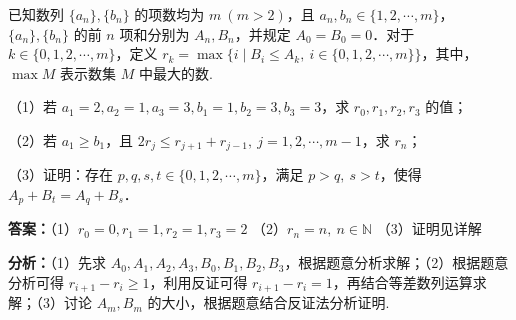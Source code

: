 \begin{question}[points=15]
已知数列 $\{a_n\}, \{b_n\}$ 的项数均为 $m\ (m>2)$，且 $a_n, b_n \in \{1,2,\cdots,m\}$，$\{a_n\}, \{b_n\}$ 的前 $n$ 项和分别为 $A_n, B_n$，并规定 $A_0=B_0=0$．对于 $k\in\{0,1,2,\cdots,m\}$，定义 $r_k = \max\{i\mid B_i \le A_k,\ i\in\{0,1,2,\cdots,m\}\}$，其中，$\max M$ 表示数集 $M$ 中最大的数.

（1）若 $a_1=2, a_2=1, a_3=3, b_1=1, b_2=3, b_3=3$，求 $r_0, r_1, r_2, r_3$ 的值；

（2）若 $a_1\ge b_1$，且 $2r_j \le r_{j+1} + r_{j-1},\ j=1,2,\cdots,m-1$，求 $r_n$；

（3）证明：存在 $p,q,s,t\in\{0,1,2,\cdots,m\}$，满足 $p>q,\ s>t$，使得 $A_p + B_t = A_q + B_s$．
\begin{solution}
\textbf{答案：}（1）$r_0=0, r_1=1, r_2=1, r_3=2$ （2）$r_n=n,\ n\in\mathbb{N}$ （3）证明见详解

\textbf{分析：}（1）先求 $A_0,A_1,A_2,A_3,B_0,B_1,B_2,B_3$，根据题意分析求解；（2）根据题意分析可得 $r_{i+1}-r_i\ge 1$，利用反证可得 $r_{i+1}-r_i=1$，再结合等差数列运算求解；（3）讨论 $A_m, B_m$ 的大小，根据题意结合反证法分析证明.


\end{solution}
\end{question}
